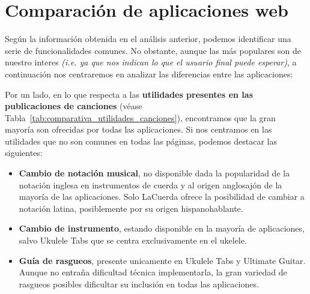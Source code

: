 \section{Comparación de aplicaciones web}

Según la información obtenida en el análisis anterior, podemos identificar una serie de funcionalidades comunes. No obstante, aunque las más populares son de nuestro interes \emph{(i.e. ya que nos indican lo que el usuario final puede esperar)}, a continuación nos centraremos en analizar las diferencias entre las aplicaciones:

Por un lado, en lo que respecta a las \textbf{utilidades presentes en las publicaciones de canciones} (véase Tabla~\ref{tab:comparativa_utilidades_canciones}), encontramos que la gran mayoría son ofrecidas por todas las aplicaciones. Si nos centramos en las utilidades que no son comunes en todas las páginas, podemos destacar las siguientes:

\begin{itemize}
    \item \textbf{Cambio de notación musical}, no disponible dada la popularidad de la notación inglesa en instrumentos de cuerda y al origen anglosajón de la mayoría de las aplicaciones. Solo LaCuerda ofrece la posibilidad de cambiar a notación latina, posiblemente por su origen hispanohablante.
    \item \textbf{Cambio de instrumento}, estando disponible en la mayoría de aplicaciones, salvo Ukulele Tabs que se centra exclusivamente en el ukelele.
    \item \textbf{Guía de rasgueos}, presente unicamente en Ukulele Tabs y Ultimate Guitar. Aunque no entraña dificultad técnica implementarla, la gran variedad de rasgueos posibles dificultar su inclusión en todas las aplicaciones.
\end{itemize}

